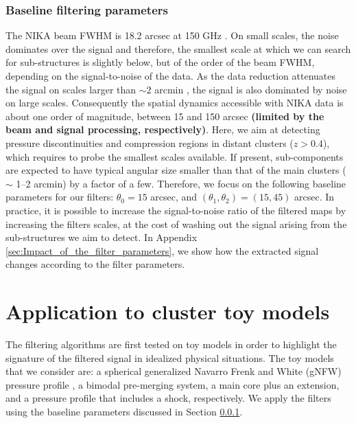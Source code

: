 \documentclass[twocolumn,traditabstract]{aa}
\begin{document}
\subsubsection{Baseline filtering parameters}\label{sec:Baseline_filtering_parameters}
The NIKA beam FWHM is 18.2 arcsec at 150 GHz \citep{Catalano2014}. On small scales, the noise dominates over the signal and therefore, the smallest scale at which we can search for sub-structures is slightly below, but of the order of the beam FWHM, depending on the signal-to-noise of the data. As the data reduction attenuates the signal on scales larger than $\sim 2$ arcmin \citep[see][and Section \ref{sec:Systematics_and_noise_properties}]{Adam2015}, the signal is also dominated by noise on large scales. Consequently the spatial dynamics accessible with NIKA data is about one order of magnitude, between 15 and 150 arcsec {\bf (limited by the beam and signal processing, respectively)}. Here, we aim at detecting pressure discontinuities and compression regions in distant clusters ($z>0.4$), which requires to probe the smallest scales available. If present, sub-components are expected to have typical angular size smaller than that of the main clusters ($\sim$ 1--2 arcmin) by a factor of a few. Therefore, we focus on the following baseline parameters for our filters: $\theta_0 = 15$ arcsec, and $\left(\theta_1, \theta_2\right) = \left(15, 45\right)$ arcsec. In practice, it is possible to increase the signal-to-noise ratio of the filtered maps by increasing the filters scales, at the cost of washing out the signal arising from the sub-structures we aim to detect. In Appendix \ref{sec:Impact_of_the_filter_parameters}, we show how the extracted signal changes according to the filter parameters.

\section{Application to cluster toy models}\label{sec:Application_to_toy_models}
The filtering algorithms are first tested on toy models in order to highlight the signature of the filtered signal in idealized physical situations. The toy models that we consider are: a spherical generalized Navarro Frenk and White (gNFW) pressure profile \citep{Nagai2007}, a bimodal pre-merging system, a main core plus an extension, and a pressure profile that includes a shock, respectively. We apply the filters using the baseline parameters discussed in Section \ref{sec:Baseline_filtering_parameters}.
\end{document}
